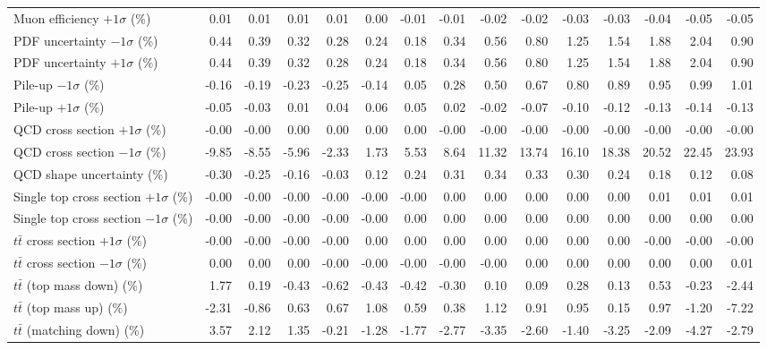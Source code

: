 \begin{table}[htbp]
{\begin{tabular}{lrrrrrrrrrrrrrr}
Muon efficiency $+1\sigma$ (\%) & 0.01 & 0.01 & 0.01 & 0.01 & 0.00 & -0.01 & -0.01 & -0.02 & -0.02 & -0.03 & -0.03 & -0.04 & -0.05 & -0.05 \\ 
PDF uncertainty $-1\sigma$ (\%) & 0.44 & 0.39 & 0.32 & 0.28 & 0.24 & 0.18 & 0.34 & 0.56 & 0.80 & 1.25 & 1.54 & 1.88 & 2.04 & 0.90 \\ 
PDF uncertainty $+1\sigma$ (\%) & 0.44 & 0.39 & 0.32 & 0.28 & 0.24 & 0.18 & 0.34 & 0.56 & 0.80 & 1.25 & 1.54 & 1.88 & 2.04 & 0.90 \\ 
Pile-up $-1\sigma$ (\%) & -0.16 & -0.19 & -0.23 & -0.25 & -0.14 & 0.05 & 0.28 & 0.50 & 0.67 & 0.80 & 0.89 & 0.95 & 0.99 & 1.01 \\ 
Pile-up $+1\sigma$ (\%) & -0.05 & -0.03 & 0.01 & 0.04 & 0.06 & 0.05 & 0.02 & -0.02 & -0.07 & -0.10 & -0.12 & -0.13 & -0.14 & -0.13 \\ 
QCD cross section \ensuremath{+1\sigma} (\%) & -0.00 & -0.00 & 0.00 & 0.00 & 0.00 & 0.00 & -0.00 & -0.00 & -0.00 & -0.00 & -0.00 & -0.00 & -0.00 & -0.00 \\ 
QCD cross section \ensuremath{-1\sigma} (\%) & -9.85 & -8.55 & -5.96 & -2.33 & 1.73 & 5.53 & 8.64 & 11.32 & 13.74 & 16.10 & 18.38 & 20.52 & 22.45 & 23.93 \\ 
QCD shape uncertainty (\%) & -0.30 & -0.25 & -0.16 & -0.03 & 0.12 & 0.24 & 0.31 & 0.34 & 0.33 & 0.30 & 0.24 & 0.18 & 0.12 & 0.08 \\ 
Single top cross section $+1\sigma$ (\%) & -0.00 & -0.00 & -0.00 & -0.00 & -0.00 & -0.00 & 0.00 & 0.00 & 0.00 & 0.00 & 0.00 & 0.01 & 0.01 & 0.01 \\ 
Single top cross section $-1\sigma$ (\%) & -0.00 & -0.00 & -0.00 & -0.00 & -0.00 & 0.00 & 0.00 & 0.00 & 0.00 & 0.00 & 0.00 & 0.00 & 0.00 & 0.00 \\ 
$t\bar{t}$ cross section $+1\sigma$ (\%) & -0.00 & -0.00 & -0.00 & -0.00 & 0.00 & 0.00 & 0.00 & 0.00 & 0.00 & 0.00 & 0.00 & -0.00 & -0.00 & -0.00 \\ 
$t\bar{t}$ cross section $-1\sigma$ (\%) & 0.00 & 0.00 & 0.00 & -0.00 & -0.00 & -0.00 & -0.00 & -0.00 & 0.00 & 0.00 & 0.00 & 0.00 & 0.00 & 0.01 \\ 
$t\bar{t}$ (top mass down) (\%) & 1.77 & 0.19 & -0.43 & -0.62 & -0.43 & -0.42 & -0.30 & 0.10 & 0.09 & 0.28 & 0.13 & 0.53 & -0.23 & -2.44 \\ 
$t\bar{t}$ (top mass up) (\%) & -2.31 & -0.86 & 0.63 & 0.67 & 1.08 & 0.59 & 0.38 & 1.12 & 0.91 & 0.95 & 0.15 & 0.97 & -1.20 & -7.22 \\ 
$t\bar{t}$ (matching down) (\%) & 3.57 & 2.12 & 1.35 & -0.21 & -1.28 & -1.77 & -2.77 & -3.35 & -2.60 & -1.40 & -3.25 & -2.09 & -4.27 & -2.79 \\ 

\end{tabular}}
\end{table}

